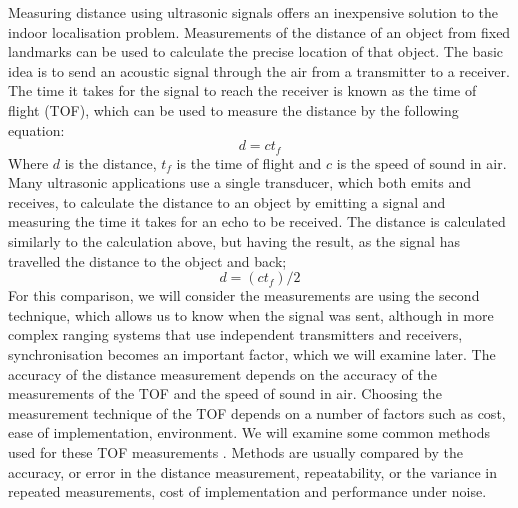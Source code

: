 \documentclass[]{final_report}
\begin{document}
Measuring distance using ultrasonic signals offers an inexpensive solution to the indoor localisation problem. Measurements of the distance of an object from fixed landmarks can be used to calculate the precise location of that object. The basic idea is to send an acoustic signal through the air from a transmitter to a receiver. The time it takes for the signal to reach the receiver is known as the time of flight (TOF), which can be used to measure the distance by the following equation:\[ d=ct_{f} \]
Where $d$ is the distance, $t_{f}$ is the time of flight and $c$ is the speed of sound in air. Many ultrasonic applications use a single transducer, which both emits and receives, to calculate the distance to an object by emitting a signal and measuring the time it takes for an echo to be received. The distance is calculated similarly to the calculation above, but having the result, as the signal has travelled the distance to the object and back; \[ d=\left(ct_f\right)/2 \]
For this comparison, we will consider the measurements are using the second technique, which allows us to know when the signal was sent, although in more complex ranging systems that use independent transmitters and receivers, synchronisation becomes an important factor, which we will examine later.
The accuracy of the distance measurement depends on the accuracy of the measurements of the TOF and the speed of sound in air.  Choosing the measurement technique of the TOF depends on a number of factors such as cost, ease of implementation, environment. We will examine some common methods used for these TOF measurements \cite{barshan2000fast}. Methods are usually compared by the accuracy, or error in the distance measurement, repeatability, or the variance in repeated measurements, cost of implementation and performance under noise.
\end{document}
